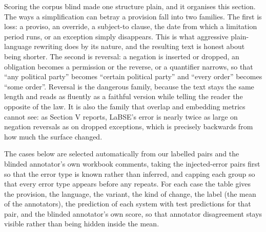 \documentclass[conference]{IEEEtran}
\begin{document}
Scoring the corpus blind made one structure plain, and it organises this section. The ways a simplification can betray a provision fall into two families. The first is loss: a proviso, an override, a subject-to clause, the date from which a limitation period runs, or an exception simply disappears. This is what aggressive plain-language rewriting does by its nature, and the resulting text is honest about being shorter. The second is reversal: a negation is inserted or dropped, an obligation becomes a permission or the reverse, or a quantifier narrows, so that “any political party” becomes “certain political party” and “every order” becomes “some order”. Reversal is the dangerous family, because the text stays the same length and reads as fluently as a faithful version while telling the reader the opposite of the law. It is also the family that overlap and embedding metrics cannot see: as Section V reports, LaBSE's error is nearly twice as large on negation reversals as on dropped exceptions, which is precisely backwards from how much the surface changed.

The cases below are selected automatically from our labelled pairs and the blinded annotator's own workbook comments, taking the injected-error pairs first so that the error type is known rather than inferred, and capping each group so that every error type appears before any repeats. For each case the table gives the provision, the language, the variant, the kind of change, the label (the mean of the annotators), the prediction of each system with test predictions for that pair, and the blinded annotator's own score, so that annotator disagreement stays visible rather than being hidden inside the mean.
\end{document}
